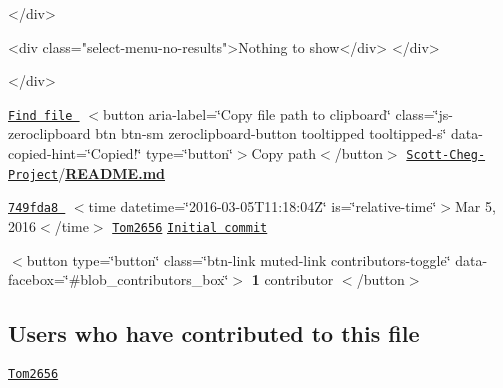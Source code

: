  

\begin{DoxyVerb}    </div>

    <div class="select-menu-no-results">Nothing to show</div>
  </div>

</div>
\end{DoxyVerb}
  

  \href{/Tom2656/Scott-Cheg-Project/find/master}{\tt Find file } $<$button aria-\/label=\char`\"{}\+Copy file path to clipboard\char`\"{} class=\char`\"{}js-\/zeroclipboard btn btn-\/sm zeroclipboard-\/button tooltipped tooltipped-\/s\char`\"{} data-\/copied-\/hint=\char`\"{}\+Copied!\char`\"{} type=\char`\"{}button\char`\"{}$>$Copy path$<$/button$>$   \href{/Tom2656/Scott-Cheg-Project}{\tt Scott-\/\+Cheg-\/\+Project}/{\bfseries \hyperlink{_r_e_a_d_m_e_8md}{R\+E\+A\+D\+M\+E.\+md}}  

   \href{/Tom2656/Scott-Cheg-Project/commit/749fda8df241f5821058b28847b156a6dd98b44b}{\tt 749fda8 } $<$time datetime=\char`\"{}2016-\/03-\/05\+T11\+:18\+:04\+Z\char`\"{} is=\char`\"{}relative-\/time\char`\"{}$>$Mar 5, 2016$<$/time$>$    \href{/Tom2656}{\tt Tom2656} \href{/Tom2656/Scott-Cheg-Project/commit/749fda8df241f5821058b28847b156a6dd98b44b}{\tt Initial commit} 

  $<$button type=\char`\"{}button\char`\"{} class=\char`\"{}btn-\/link muted-\/link contributors-\/toggle\char`\"{} data-\/facebox=\char`\"{}\#blob\+\_\+contributors\+\_\+box\char`\"{}$>$ {\bfseries 1} contributor $<$/button$>$

 

  \subsection*{Users who have contributed to this file}

 
\begin{DoxyItemize}
\item  \href{/Tom2656}{\tt Tom2656}  
\end{DoxyItemize} 

  

